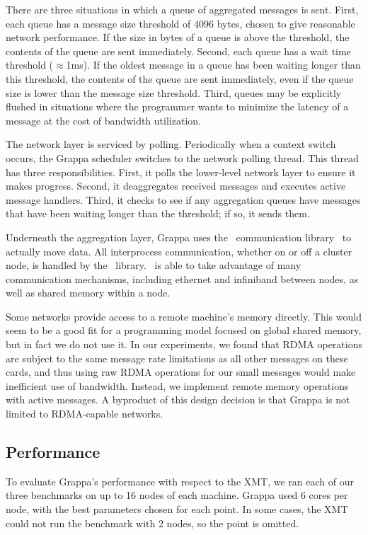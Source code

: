 There are three situations in which a queue of aggregated messages is sent. First, each queue has a message size threshold of 4096 bytes, chosen to give reasonable network performance. If the size in bytes of a queue is above the threshold, the contents of the queue are sent immediately. Second, each queue has a wait time threshold ($\approx${1ms}). If the oldest message in a queue has been waiting longer than this threshold, the contents of the queue are sent immediately, even if the queue size is lower than the message size threshold.  Third, queues may be explicitly flushed in situations where the programmer wants to minimize the latency of a message at the cost of bandwidth utilization.

The network layer is serviced by polling. Periodically when a context switch occurs, the Grappa scheduler switches to the network polling thread. This thread has three responsibilities. First, it polls the lower-level network layer to ensure it makes progress. Second, it deaggregates received messages and executes active message handlers. Third, it checks to see if any aggregation queues have messages that have been waiting longer than the threshold; if so, it sends them.

Underneath the aggregation layer, Grappa uses the \gasnet~communication library~\cite{gasnet} to actually move data. All interprocess communication, whether on or off a cluster node, is handled by the \gasnet~library. \gasnet~is able to take advantage of many communication mechanisms, including ethernet and infiniband between nodes, as well as shared memory within a node.

Some networks provide access to a remote machine's memory directly. This would seem to be a good fit for a programming model focused on global shared memory, but in fact we do not use it. In our experiments, we found that RDMA operations are subject to the same message rate limitations as all other messages on these cards, and thus using raw RDMA operations for our small messages would make inefficient use of bandwidth. Instead, we implement remote memory operations with active messages. A byproduct of this design decision is that Grappa is not limited to RDMA-capable networks.

\subsection{Performance}

To evaluate Grappa's performance with respect to the XMT, we ran each of our three benchmarks on up to 16 nodes of each machine. Grappa used 6 cores per node, with the best parameters chosen for each point. In some cases, the XMT could not run the benchmark with 2 nodes, so the point is omitted.

